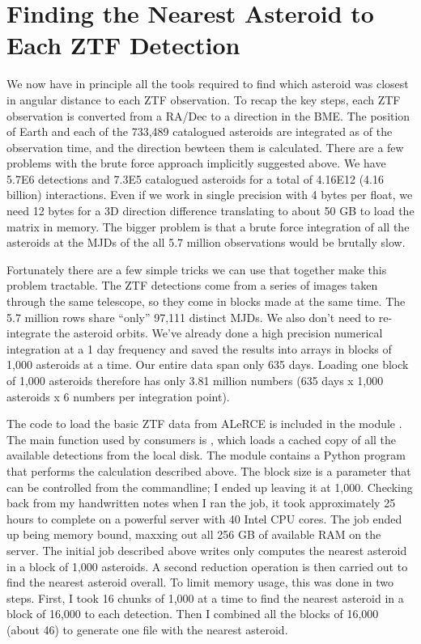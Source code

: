 \section{Finding the Nearest Asteroid to Each ZTF Detection}
\label{section_ztf_nearest_ast}
We now have in principle all the tools required to find which asteroid was closest in angular distance to each ZTF observation.
To recap the key steps, each ZTF observation is converted from a RA/Dec to a direction in the BME.
The position of Earth and each of the 733,489 catalogued asteroids are integrated as of the observation time, and the direction bewteen them is calculated.
There are a few problems with the brute force approach implicitly suggested above.
We have 5.7E6 detections and 7.3E5 catalogued asteroids for a total of 4.16E12 (4.16 billion) interactions.
Even if we work in single precision with 4 bytes per float, we need 12 bytes for a 3D direction difference translating to about 50 GB to load the matrix in memory.
The bigger problem is that a brute force integration of all the asteroids at the MJDs of the all 5.7 million observations would be brutally slow.

Fortunately there are a few simple tricks we can use that together make this problem tractable.
The ZTF detections come from a series of images taken through the same telescope, so they come in blocks made at the same time.
The 5.7 million rows share ``only'' 97,111 distinct MJDs.
We also don't need to re-integrate the asteroid orbits.
We've already done a high precision numerical integration at a 1 day frequency and saved the results into  arrays in blocks of 1,000 asteroids at a time.
Our entire data span only 635 days.  
Loading one block of 1,000 asteroids therefore has only 3.81 million numbers (635 days x 1,000 asteroids x 6 numbers per integration point).

The code to load the basic ZTF data from ALeRCE is included in the module .
The main function used by consumers is , which loads a cached copy of all the available detections from the local disk.
The module  contains a Python program that performs the calculation described above.
The block size is a parameter that can be controlled from the commandline; I ended up leaving it at 1,000.
Checking back from my handwritten notes when I ran the job, it took approximately 25 hours to complete on a powerful server with 40 Intel CPU cores.
The job ended up being memory bound, maxxing out all 256 GB of available RAM on the server.
The initial job described above writes only computes the nearest asteroid in a block of 1,000 asteroids.
A second reduction operation is then carried out to find the nearest asteroid overall.
To limit memory usage, this was done in two steps.
First, I took 16 chunks of 1,000 at a time to find the nearest asteroid in a block of 16,000 to each detection.
Then I combined all the blocks of 16,000 (about 46) to generate one file with the nearest asteroid.

